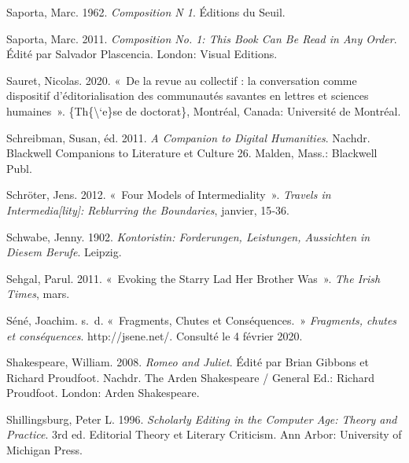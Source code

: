 \begin{CSLReferences}{1}{0}
\leavevmode{}%
Saporta, Marc. 1962. \emph{Composition N{\textdegree} 1}. {{É}ditions du
Seuil}.

\leavevmode{}%
Saporta, Marc. 2011. \emph{Composition No. 1: {This Book Can Be Read} in
{Any Order}}. Édité par Salvador Plascencia. {London}: {Visual
Editions}.

\leavevmode{}%
Sauret, Nicolas. 2020. {«~{De la revue au collectif : la conversation
comme dispositif d'{é}ditorialisation des communaut{é}s savantes en
lettres et sciences humaines}~»}. \{Th\{\textbackslash`e\}se de
doctorat\}, {Montr{é}al, Canada}: Universit{é} de Montr{é}al.

\leavevmode{}%
Schreibman, Susan, éd. 2011. \emph{A {Companion} to {Digital
Humanities}}. Nachdr. Blackwell Companions to Literature et Culture 26.
{Malden, Mass.}: {Blackwell Publ}.

\leavevmode{}%
Schröter, Jens. 2012. {«~Four {Models} of {Intermediality}~»}.
\emph{Travels in Intermedia{[}lity{]}: Reblurring the Boundaries},
janvier, 15‑36.

\leavevmode{}%
Schwabe, Jenny. 1902. \emph{Kontoristin: {Forderungen}, {Leistungen},
{Aussichten} in Diesem {Berufe}}. {Leipzig}.

\leavevmode{}%
Sehgal, Parul. 2011. {«~Evoking the {Starry Lad Her Brother Was}~»}.
\emph{The Irish Times}, mars.

\leavevmode{}%
Séné, Joachim. s.~d. {«~Fragments, Chutes et Cons{é}quences.~»}
\emph{Fragments, chutes et cons{é}quences}. http://jsene.net/. Consulté
le 4 février 2020.

\leavevmode{}%
Shakespeare, William. 2008. \emph{Romeo and {Juliet}}. Édité par Brian
Gibbons et Richard Proudfoot. Nachdr. The {Arden Shakespeare} / General
Ed.: {Richard Proudfoot}. {London}: {Arden Shakespeare}.

\leavevmode{}%
Shillingsburg, Peter L. 1996. \emph{Scholarly Editing in the Computer
Age: Theory and Practice}. 3rd ed. Editorial Theory et Literary
Criticism. {Ann Arbor}: {University of Michigan Press}.


\end{CSLReferences}

